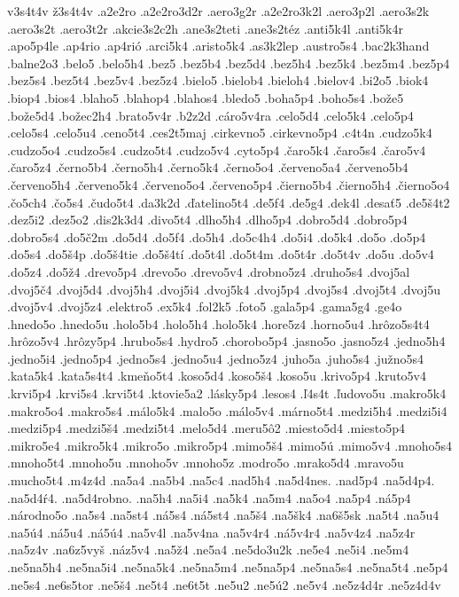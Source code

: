 {v3s4t4v
ž3s4t4v
.a2e2ro
.a2e2ro3d2r
.aero3g2r
.a2e2ro3k2l
.aero3p2l
.aero3s2k
.aero3s2t
.aero3t2r
.akcie3s2c2h
.ane3s2teti
.ane3s2téz
.anti5k4l
.anti5k4r
.apo5p4le
.ap4rio
.ap4rió
.arci5k4
.aristo5k4
.as3k2lep
.austro5s4
.bac2k3hand
.balne2o3
.belo5
.belo5h4
.bez5
.bez5b4
.bez5d4
.bez5h4
.bez5k4
.bez5m4
.bez5p4
.bez5s4
.bez5t4
.bez5v4
.bez5z4
.bielo5
.bielob4
.bieloh4
.bielov4
.bi2o5
.biok4
.biop4
.bios4
.blaho5
.blahop4
.blahos4
.bledo5
.boha5p4
.boho5s4
.bože5
.bože5d4
.božec2h4
.brato5v4r
.b2z2d
.cáro5v4ra
.celo5d4
.celo5k4
.celo5p4
.celo5s4
.celo5u4
.ceno5t4
.ces2t5maj
.cirkevno5
.cirkevno5p4
.c4t4n
.cudzo5k4
.cudzo5o4
.cudzo5s4
.cudzo5t4
.cudzo5v4
.cyto5p4
.čaro5k4
.čaro5s4
.čaro5v4
.čaro5z4
.černo5b4
.černo5h4
.černo5k4
.černo5o4
.červeno5a4
.červeno5b4
.červeno5h4
.červeno5k4
.červeno5o4
.červeno5p4
.čierno5b4
.čierno5h4
.čierno5o4
.čo5ch4
.čo5s4
.čudo5t4
.da3k2d
.ďatelino5t4
.de5f4
.de5g4
.dek4l
.desať5
.de5š4t2
.dez5i2
.dez5o2
.dis2k3d4
.divo5t4
.dlho5h4
.dlho5p4
.dobro5d4
.dobro5p4
.dobro5s4
.do5č2m
.do5d4
.do5f4
.do5h4
.do5c4h4
.do5i4
.do5k4
.do5o
.do5p4
.do5s4
.do5š4p
.do5š4tie
.do5š4tí
.do5t4l
.do5t4m
.do5t4r
.do5t4v
.do5u
.do5v4
.do5z4
.do5ž4
.drevo5p4
.drevo5o
.drevo5v4
.drobno5z4
.druho5s4
.dvoj5al
.dvoj5č4
.dvoj5d4
.dvoj5h4
.dvoj5i4
.dvoj5k4
.dvoj5p4
.dvoj5s4
.dvoj5t4
.dvoj5u
.dvoj5v4
.dvoj5z4
.elektro5
.ex5k4
.fol2k5
.foto5
.gala5p4
.gama5g4
.ge4o
.hnedo5o
.hnedo5u
.holo5b4
.holo5h4
.holo5k4
.hore5z4
.horno5u4
.hrôzo5s4t4
.hrôzo5v4
.hrôzy5p4
.hrubo5s4
.hydro5
.chorobo5p4
.jasno5o
.jasno5z4
.jedno5h4
.jedno5i4
.jedno5p4
.jedno5s4
.jedno5u4
.jedno5z4
.juho5a
.juho5s4
.južno5s4
.kata5k4
.kata5s4t4
.kmeňo5t4
.koso5d4
.koso5š4
.koso5u
.krivo5p4
.kruto5v4
.krvi5p4
.krvi5s4
.krvi5t4
.ktovie5a2
.lásky5p4
.lesos4
.ľ4s4t
.ľudovo5u
.makro5k4
.makro5o4
.makro5s4
.málo5k4
.malo5o
.málo5v4
.márno5t4
.medzi5h4
.medzi5i4
.medzi5p4
.medzi5š4
.medzi5t4
.melo5d4
.meru5ô2
.miesto5d4
.miesto5p4
.mikro5e4
.mikro5k4
.mikro5o
.mikro5p4
.mimo5š4
.mimo5ú
.mimo5v4
.mnoho5s4
.mnoho5t4
.mnoho5u
.mnoho5v
.mnoho5z
.modro5o
.mrako5d4
.mravo5u
.mucho5t4
.m4z4d
.na5a4
.na5b4
.na5c4
.nad5h4
.na5d4nes.
.nad5p4
.na5d4p4.
.na5d4ŕ4.
.na5d4robno.
.na5h4
.na5i4
.na5k4
.na5m4
.na5o4
.na5p4
.ná5p4
.národno5o
.na5s4
.na5st4
.ná5s4
.ná5st4
.na5š4
.na5šk4
.na6š5sk
.na5t4
.na5u4
.na5ú4
.ná5u4
.ná5ú4
.na5v4l
.na5v4na
.na5v4r4
.ná5v4r4
.na5v4z4
.na5z4r
.na5z4v
.na6z5vyš
.náz5v4
.na5ž4
.ne5a4
.ne5do3u2k
.ne5e4
.ne5i4
.ne5m4
.ne5na5h4
.ne5na5i4
.ne5na5k4
.ne5na5m4
.ne5na5p4
.ne5na5s4
.ne5na5t4
.ne5p4
.ne5s4
.ne6s5tor
.ne5š4
.ne5t4
.ne6t5t
.ne5u2
.ne5ú2
.ne5v4
.ne5z4d4r
.ne5z4d4v
}

